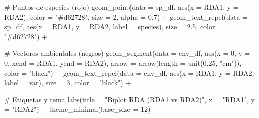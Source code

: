 \documentclass[
  spanish,
  11pt,
  a4paper,
  DIV=11,
  numbers=noendperiod]{scrartcl}
\newenvironment{Shaded}{\begin{snugshade}}{\end{snugshade}}
\newcommand{\AttributeTok}[1]{\textcolor[rgb]{0.40,0.45,0.13}{#1}}
\newcommand{\CommentTok}[1]{\textcolor[rgb]{0.37,0.37,0.37}{#1}}
\newcommand{\DecValTok}[1]{\textcolor[rgb]{0.68,0.00,0.00}{#1}}
\newcommand{\FloatTok}[1]{\textcolor[rgb]{0.68,0.00,0.00}{#1}}
\newcommand{\FunctionTok}[1]{\textcolor[rgb]{0.28,0.35,0.67}{#1}}
\newcommand{\NormalTok}[1]{\textcolor[rgb]{0.00,0.23,0.31}{#1}}
\newcommand{\SpecialCharTok}[1]{\textcolor[rgb]{0.37,0.37,0.37}{#1}}
\newcommand{\StringTok}[1]{\textcolor[rgb]{0.13,0.47,0.30}{#1}}
\begin{document}
\begin{Shaded}
\begin{Highlighting}[numbers=left,,]
  \CommentTok{\# Puntos de especies (rojo)}
  \FunctionTok{geom\_point}\NormalTok{(}\AttributeTok{data =}\NormalTok{ sp\_df, }\FunctionTok{aes}\NormalTok{(}\AttributeTok{x =}\NormalTok{ RDA1, }\AttributeTok{y =}\NormalTok{ RDA2), }\AttributeTok{color =} \StringTok{"\#d62728"}\NormalTok{, }
             \AttributeTok{size =} \DecValTok{2}\NormalTok{, }\AttributeTok{alpha =} \FloatTok{0.7}\NormalTok{) }\SpecialCharTok{+}
  \FunctionTok{geom\_text\_repel}\NormalTok{(}\AttributeTok{data =}\NormalTok{ sp\_df, }\FunctionTok{aes}\NormalTok{(}\AttributeTok{x =}\NormalTok{ RDA1, }\AttributeTok{y =}\NormalTok{ RDA2, }\AttributeTok{label =}\NormalTok{ species), }
                  \AttributeTok{size =} \FloatTok{2.5}\NormalTok{, }\AttributeTok{color =} \StringTok{"\#d62728"}\NormalTok{) }\SpecialCharTok{+}
  
  \CommentTok{\# Vectores ambientales (negros)}
  \FunctionTok{geom\_segment}\NormalTok{(}\AttributeTok{data =}\NormalTok{ env\_df, }\FunctionTok{aes}\NormalTok{(}\AttributeTok{x =} \DecValTok{0}\NormalTok{, }\AttributeTok{y =} \DecValTok{0}\NormalTok{, }\AttributeTok{xend =}\NormalTok{ RDA1, }\AttributeTok{yend =}\NormalTok{ RDA2),}
               \AttributeTok{arrow =} \FunctionTok{arrow}\NormalTok{(}\AttributeTok{length =} \FunctionTok{unit}\NormalTok{(}\FloatTok{0.25}\NormalTok{, }\StringTok{"cm"}\NormalTok{)), }\AttributeTok{color =} \StringTok{"black"}\NormalTok{) }\SpecialCharTok{+}
  \FunctionTok{geom\_text\_repel}\NormalTok{(}\AttributeTok{data =}\NormalTok{ env\_df, }\FunctionTok{aes}\NormalTok{(}\AttributeTok{x =}\NormalTok{ RDA1, }\AttributeTok{y =}\NormalTok{ RDA2, }\AttributeTok{label =}\NormalTok{ var), }
                  \AttributeTok{size =} \DecValTok{3}\NormalTok{, }\AttributeTok{color =} \StringTok{"black"}\NormalTok{) }\SpecialCharTok{+}
  
  \CommentTok{\# Etiquetas y tema}
  \FunctionTok{labs}\NormalTok{(}\AttributeTok{title =} \StringTok{"Biplot RDA (RDA1 vs RDA2)"}\NormalTok{,}
       \AttributeTok{x =} \StringTok{"RDA1"}\NormalTok{, }\AttributeTok{y =} \StringTok{"RDA2"}\NormalTok{) }\SpecialCharTok{+}
  \FunctionTok{theme\_minimal}\NormalTok{(}\AttributeTok{base\_size =} \DecValTok{12}\NormalTok{)}
\end{Highlighting}
\end{Shaded}
\end{document}
